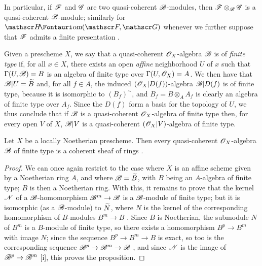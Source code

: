 In particular, if $\mathscr{F}$ and $\mathscr{G}$ are two quasi-coherent $\mathscr{B}$-modules, then $\mathscr{F}\otimes_{\mathscr{B}}\mathscr{G}$ is a quasi-coherent $\mathscr{B}$-module; similarly for $\shHom(\sh{F},\sh{G})$ whenever we further suppose that $\mathscr{F}$ admits a finite presentation .

\begin{env}[9.6.2]
\label{1.9.6.2}
Given a prescheme $X$, we say that a quasi-coherent $\mathscr{O}_X$-algebra $\mathscr{B}$ is of \emph{finite type} if, for all $x\in X$, there exists an open \emph{affine} neighborhood $U$ of $x$ such that $\Gamma(U,\mathscr{B})=B$ is an algebra of finite type over $\Gamma(U,\mathscr{O}_X)=A$.
We then have that $\mathscr{B}|U={\widetilde{B}}$ and, for all $f\in A$, the induced $(\mathscr{O}_X|D(f))$-algebra $\mathscr{B}|D(f)$ is of finite type, because it is isomorphic to $(B_f)^{\sim}$, and $B_f=B\otimes_A A_f$ is clearly an algebra of finite type over $A_f$.
Since the $D(f)$ form a basis for the topology of $U$, we thus conclude that if $\mathscr{B}$ is a quasi-coherent $\mathscr{O}_X$-algebra of finite type then, for every open $V$ of $X$, $\mathscr{B}|V$ is a quasi-coherent $(\mathscr{O}_X|V)$-algebra of finite type.
\end{env}

\begin{proposition}[9.6.3]
\label{1.9.6.3}
Let $X$ be a locally Noetherian prescheme.
Then every quasi-coherent $\mathscr{O}_X$-algebra $\mathscr{B}$ of finite type is a coherent sheaf of rings .
\end{proposition}

\begin{proof}
\label{proof-1.9.6.3}
We can once again restrict to the case where $X$ is an affine scheme given by a Noetherian ring $A$, and where $\mathscr{B}={\widetilde{B}}$, with $B$ being an $A$-algebra of finite type; $B$ is then a Noetherian ring.
With this, it remains to prove that the kernel $\mathscr{N}$ of a $\mathscr{B}$-homomorphism $\sh{B}^m\to\sh{B}$ is a $\mathscr{B}$-module
of finite type; but it is isomorphic (as a $\mathscr{B}$-module) to ${\widetilde{N}}$, where $N$ is the kernel of the corresponding homomorphism of $B$-modules $B^m\to B$ .
Since $B$ is Noetherian, the submodule $N$ of $B^m$ is a $B$-module of finite type, so there exists a homomorphism $B^p\to B^m$ with image $N$; since the sequence $B^p\to B^m\to B$ is exact, so too is the corresponding sequence $\sh{B}^p\to\sh{B}^m\to\sh{B}$ , and since $\mathscr{N}$ is the image of $\sh{B}^p\to\sh{B}^m$ [i], this proves the proposition.
\end{proof}


